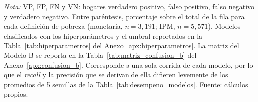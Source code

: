 \begin{table}[H]
  \centering
  \caption{Matriz de confusión del Modelo A en el conjunto de prueba,
  pobreza monetaria e IPM, 2013$\to$2016.}
  \label{tab:matriz_confusion_a}
  \footnotesize
  \setlength{\tabcolsep}{4pt}
  \begin{minipage}{0.95\textwidth}
    \vspace{4pt}
    \footnotesize \textit{Nota:} VP, FP, FN y VN: hogares verdadero
    positivo, falso positivo, falso negativo y verdadero negativo. Entre
    paréntesis, porcentaje sobre el total de la fila para cada definición
    de pobreza (monetaria, $n=3{,}191$; IPM, $n=5{,}571$). Modelos
    clasificados con los hiperparámetros y el umbral reportados en la
    Tabla~\ref{tab:hiperparametros} del Anexo~\ref{apx:hiperparametros}. La matriz del Modelo B se reporta en la Tabla~\ref{tab:matriz_confusion_b} del Anexo~\ref{apx:confusion_b}.
    Corresponde a una sola corrida de cada modelo, por lo que el
    \emph{recall} y la precisión que se derivan de ella difieren
    levemente de los promedios de 5 semillas de la
    Tabla~\ref{tab:desempeno_modelos}.
    Fuente: cálculos propios.
  \end{minipage}
\end{table}
